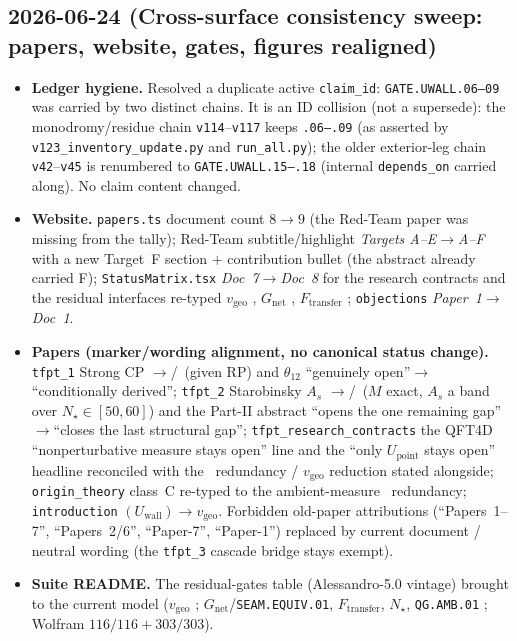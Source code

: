 \subsection*{2026-06-24 (Cross-surface consistency sweep: papers, website, gates, figures realigned)}
\begin{itemize}
\item \textbf{Ledger hygiene.} Resolved a duplicate active \texttt{claim\_id}: \texttt{GATE.UWALL.06--09} was carried by two distinct chains. It is an ID collision (not a supersede): the monodromy/residue chain \texttt{v114}--\texttt{v117} keeps \texttt{.06--.09} (as asserted by \texttt{v123\_inventory\_update.py} and \texttt{run\_all.py}); the older exterior-leg chain \texttt{v42}--\texttt{v45} is renumbered to \texttt{GATE.UWALL.15--.18} (internal \texttt{depends\_on} carried along). No claim content changed.
\item \textbf{Website.} \texttt{papers.ts} document count $8\to9$ (the Red-Team paper was missing from the tally); Red-Team subtitle/highlight \emph{Targets A--E}$\to$\emph{A--F} with a new Target~F section $+$ contribution bullet (the abstract already carried F); \texttt{StatusMatrix.tsx} \emph{Doc~7}$\to$\emph{Doc~8} for the research contracts and the residual interfaces re-typed $v_{\mathrm{geo}}$ \mO, $G_{\mathrm{net}}$ \mC, $F_{\mathrm{transfer}}$ \mC; \texttt{objections} \emph{Paper~1}$\to$\emph{Doc~1}.
\item \textbf{Papers (marker/wording alignment, no canonical status change).} \texttt{tfpt\_1} Strong CP \mE$\to$\mE/\mC\ (given RP) and $\theta_{12}$ ``genuinely open''$\to$``conditionally derived''; \texttt{tfpt\_2} Starobinsky $A_s$ \mE$\to$\mE/\mC\ ($M$ exact, $A_s$ a band over $N_\star\in[50,60]$) and the Part-II abstract ``opens the one remaining gap''$\to$``closes the last structural gap''; \texttt{tfpt\_research\_contracts} the QFT4D ``nonperturbative measure stays open'' line and the ``only $U_{\mathrm{point}}$ stays open'' headline reconciled with the \mC\ redundancy / $v_{\mathrm{geo}}$ reduction stated alongside; \texttt{origin\_theory} class~C re-typed to the ambient-measure \mC\ redundancy; \texttt{introduction} $(U_{\mathrm{wall}})\to v_{\mathrm{geo}}$. Forbidden old-paper attributions (``Papers~1--7'', ``Papers~2/6'', ``Paper-7'', ``Paper-1'') replaced by current document / neutral wording (the \texttt{tfpt\_3} cascade bridge stays exempt).
\item \textbf{Suite README.} The residual-gates table (Alessandro-5.0 vintage) brought to the current model ($v_{\mathrm{geo}}$ \mO; $G_{\mathrm{net}}$/\texttt{SEAM.EQUIV.01}, $F_{\mathrm{transfer}}$, $N_\star$, \texttt{QG.AMB.01} \mC; Wolfram $116/116+303/303$).

\end{itemize}
